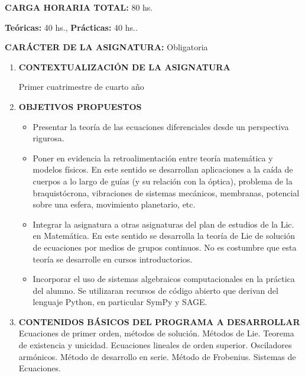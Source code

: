 \documentclass[12pt]{article}
\begin{document}
\textbf{CARGA HORARIA TOTAL:}  80 hs.

\hspace{1cm}\textbf{Teóricas:} 40 hs.,      \textbf{Prácticas:}  40 hs..

\textbf{CARÁCTER DE LA ASIGNATURA:} Obligatoria
\renewcommand{\theenumi}{\Alph{enumi}}
\renewcommand{\theenumii}{\theenumi .\arabic{enumii}}
\begin{enumerate}
 \item \textbf{CONTEXTUALIZACIÓN DE LA ASIGNATURA}

 	Primer cuatrimestre de cuarto año

 \item \textbf{OBJETIVOS PROPUESTOS}

          \begin{itemize}
	    \item  Presentar la teoría de las ecuaciones diferenciales desde un perspectiva rigurosa.

	    \item  Poner en evidencia la retroalimentación entre teoría matemática y modelos físicos. En este sentido se desarrollan aplicaciones a la caída de cuerpos a lo largo de guías (y su relación con la óptica), problema de la braquistócrona, vibraciones de sistemas mecánicos, membranas,  potencial sobre una esfera, movimiento planetario, etc.

	    \item  Integrar la asignatura a otras asignaturas del plan de estudios de la Lic. en Matemática. En este sentido se desarrolla la teoría de Lie de solución de ecuaciones por medios de grupos continuos. No es costumbre que esta teoría se desarrolle en cursos introductorios.

\item  Incorporar el uso de sistemas algebraicos computacionales en la práctica del  alumno. Se utilizaran recursos de código abierto que derivan del lenguaje Python, en particular SymPy y SAGE.


       \end{itemize}







 \item\textbf{CONTENIDOS BÁSICOS DEL PROGRAMA A DESARROLLAR}
    Ecuaciones de primer orden, métodos de solución. Métodos de Lie. Teorema de existencia y unicidad. Ecuaciones lineales de orden superior. Osciladores armónicos.   Método de desarrollo en serie. Método de Frobenius.     Sistemas de Ecuaciones.


\end{enumerate}
\end{document}
